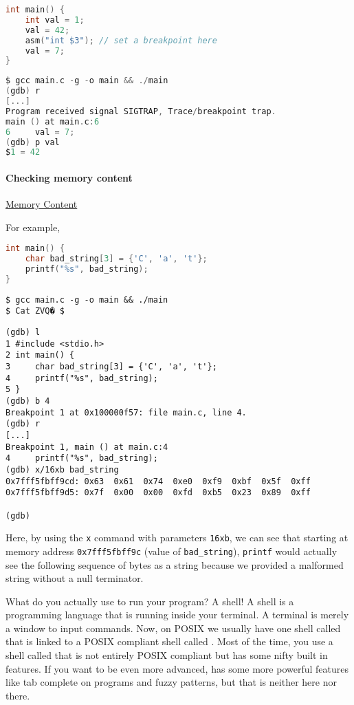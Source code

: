 \begin{lstlisting}[language=C]
int main() {
    int val = 1;
    val = 42;
    asm("int $3"); // set a breakpoint here
    val = 7;
}
\end{lstlisting}

\begin{lstlisting}[language=C]
$ gcc main.c -g -o main && ./main
(gdb) r
[...]
Program received signal SIGTRAP, Trace/breakpoint trap.
main () at main.c:6
6     val = 7;
(gdb) p val
$1 = 42
\end{lstlisting}

\paragraph{Checking memory content}\label{checking-memory-content}

\href{http://www.delorie.com/gnu/docs/gdb/gdb\_56.html}{Memory Content}

For example,

\begin{lstlisting}[language=C]
int main() {
    char bad_string[3] = {'C', 'a', 't'};
    printf("%s", bad_string);
}
\end{lstlisting}

\begin{lstlisting}
$ gcc main.c -g -o main && ./main
$ Cat ZVQ� $
\end{lstlisting}

\begin{lstlisting}
(gdb) l
1 #include <stdio.h>
2 int main() {
3     char bad_string[3] = {'C', 'a', 't'};
4     printf("%s", bad_string);
5 }
(gdb) b 4
Breakpoint 1 at 0x100000f57: file main.c, line 4.
(gdb) r
[...]
Breakpoint 1, main () at main.c:4
4     printf("%s", bad_string);
(gdb) x/16xb bad_string
0x7fff5fbff9cd: 0x63  0x61  0x74  0xe0  0xf9  0xbf  0x5f  0xff
0x7fff5fbff9d5: 0x7f  0x00  0x00  0xfd  0xb5  0x23  0x89  0xff

(gdb)
\end{lstlisting}

Here, by using the \texttt{x} command with parameters \texttt{16xb}, we can see that starting at memory address \texttt{0x7fff5fbff9c} (value of \texttt{bad\_string}), \texttt{printf} would actually see the following sequence of bytes as a string because we provided a malformed string without a null terminator.

What do you actually use to run your program? A shell! A shell is a programming language that is running inside your terminal. A terminal is merely a window to input commands. Now, on POSIX we usually have one shell called  that is linked to a POSIX compliant shell called . Most of the time, you use a shell called  that is not entirely POSIX compliant but has some nifty built in features. If you want to be even more advanced,  has some more powerful features like tab complete on programs and fuzzy patterns, but that is neither here nor there. 

